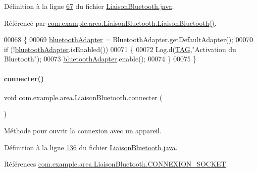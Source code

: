 Définition à la ligne \hyperlink{_liaison_bluetooth_8java_source_l00067}{67} du fichier \hyperlink{_liaison_bluetooth_8java_source}{Liaison\+Bluetooth.\+java}.



Référencé par \hyperlink{_liaison_bluetooth_8java_source_l00048}{com.\+example.\+area.\+Liaison\+Bluetooth.\+Liaison\+Bluetooth()}.


\begin{DoxyCode}
00068     \{
00069         \hyperlink{classcom_1_1example_1_1area_1_1_liaison_bluetooth_a7462ce946676c47ee83289c7bb436b64}{bluetoothAdapter} = BluetoothAdapter.getDefaultAdapter();
00070         \textcolor{keywordflow}{if} (!\hyperlink{classcom_1_1example_1_1area_1_1_liaison_bluetooth_a7462ce946676c47ee83289c7bb436b64}{bluetoothAdapter}.isEnabled())
00071         \{
00072             Log.d(\hyperlink{classcom_1_1example_1_1area_1_1_liaison_bluetooth_ac51aa4b63fae5c36734a061cc05d7fc9}{TAG},\textcolor{stringliteral}{"Activation du Bluetooth"});
00073             \hyperlink{classcom_1_1example_1_1area_1_1_liaison_bluetooth_a7462ce946676c47ee83289c7bb436b64}{bluetoothAdapter}.enable();
00074         \}
00075     \}
\end{DoxyCode}
\mbox{\label{classcom_1_1example_1_1area_1_1_liaison_bluetooth_a7b9662a4224762b23c814d1f4539002a}} 
\paragraph{\texorpdfstring{connecter()}{connecter()}}
{\footnotesize\ttfamily void com.\+example.\+area.\+Liaison\+Bluetooth.\+connecter (\begin{DoxyParamCaption}{ }\end{DoxyParamCaption})}



Méthode pour ouvrir la connexion avec un appareil. 



Définition à la ligne \hyperlink{_liaison_bluetooth_8java_source_l00136}{136} du fichier \hyperlink{_liaison_bluetooth_8java_source}{Liaison\+Bluetooth.\+java}.



Références \hyperlink{_liaison_bluetooth_8java_source_l00036}{com.\+example.\+area.\+Liaison\+Bluetooth.\+C\+O\+N\+N\+E\+X\+I\+O\+N\+\_\+\+S\+O\+C\+K\+ET}.



